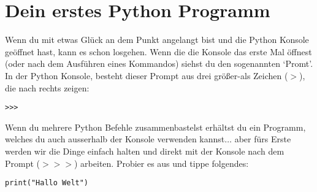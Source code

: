 \section{Dein erstes Python Programm}

Wenn du mit etwas Glück an dem Punkt angelangt bist und die Python Konsole geöffnet hast, kann es schon losgehen. Wenn die die Konsole das erste Mal öffnest (oder nach dem Ausführen eines Kommandos) siehst du den sogenannten `Promt'. In der Python Konsole, besteht dieser Prompt aus drei größer-als Zeichen ($>$), die nach rechts zeigen:

\begin{listing}
\begin{verbatim}
>>>
\end{verbatim}
\end{listing}

Wenn du mehrere Python Befehle zusammenbastelst erhältst du ein Programm, welches du auch ausserhalb der Konsole verwenden kannst$\ldots$ aber fürs Erste werden wir die Dinge einfach halten und direkt mit der Konsole nach dem Prompt ($>>>$) arbeiten. Probier es aus und tippe folgendes:

\begin{listing}
\begin{verbatim}
print("Hallo Welt")
\end{verbatim}
\end{listing}

